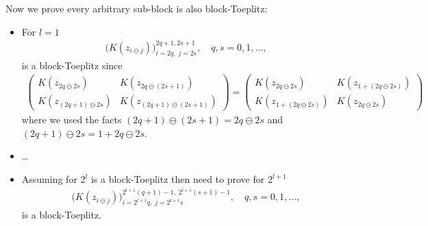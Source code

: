 \documentclass{iitthesis}          %
\begin{document}

Now we prove every arbitrary sub-block is also block-Toeplitz: 
\begin{itemize}
\item For $l=1$
\begin{align*}
\bigl( K(z_{i \ominus j})\bigr)_{i=2q, \; j=2s}^{2q+1, 2s+1}, \quad q,s=0,1,\dots,
\end{align*}
is a block-Toeplitz since
\begin{align*}
\begin{pmatrix}
K(z_{2q \ominus 2s}) & K(z_{2q \ominus (2s +1)}) \\
K(z_{(2q+1) \ominus 2s}) & K(z_{(2q+1) \ominus (2s +1)}) 
\end{pmatrix}
=
\begin{pmatrix}
K(z_{2q \ominus 2s}) & K(z_{1 + (2q \ominus 2s)}) \\
K(z_{1 + (2q \ominus 2s)}) & K(z_{ 2q \ominus 2s}) 
\end{pmatrix}
\end{align*}
where we used the facts $(2q+1) \ominus (2s+1) = 2q \ominus 2s$ and $(2q+1) \ominus 2s = 1 + 2q \ominus 2s$.

\item \ldots

\item Assuming for $2^{l}$ is a block-Toeplitz then need to prove for $2^{l+1}$ 
\begin{align*}
\bigl( K(z_{i \ominus j})\bigr)_{i=2^{l+1}q, \; j=2^{l+1}s}^{2^{l+1}(q+1)-1, \; 2^{l+1}(s+1)-1}, \quad q,s=0,1,\dots,
\end{align*}
is a block-Toeplitz.


\end{itemize}
\end{document}
